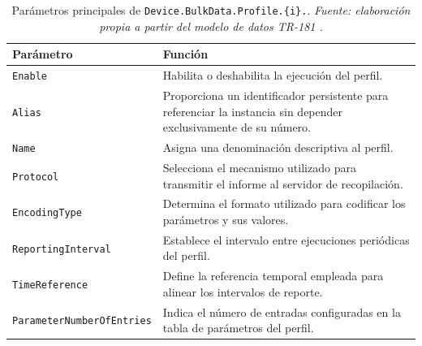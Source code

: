 \begin{table}[H]
    \centering
    \small
    \renewcommand{\arraystretch}{1.35}

    \caption[Parámetros principales de un perfil BulkData.]
    {Parámetros principales de
    \texttt{Device.BulkData.Profile.\{i\}.}.
    \textit{Fuente: elaboración propia a partir del modelo de datos
    TR-181 \cite{bbf_tr181}.}}

    \label{tab:parametros-perfil-bulkdata}

    \begin{tabular}{
        p{}
        p{}
    }
        \hline
        \textbf{Parámetro}
        &
        \textbf{Función}
        \\
        \hline

        \texttt{Enable}
        &
        Habilita o deshabilita la ejecución del perfil.
        \\

        \texttt{Alias}
        &
        Proporciona un identificador persistente para referenciar la
        instancia sin depender exclusivamente de su número.
        \\

        \texttt{Name}
        &
        Asigna una denominación descriptiva al perfil.
        \\

        \texttt{Protocol}
        &
        Selecciona el mecanismo utilizado para transmitir el informe al
        servidor de recopilación.
        \\

        \texttt{EncodingType}
        &
        Determina el formato utilizado para codificar los parámetros y
        sus valores.
        \\

        \texttt{ReportingInterval}
        &
        Establece el intervalo entre ejecuciones periódicas del perfil.
        \\

        \texttt{TimeReference}
        &
        Define la referencia temporal empleada para alinear los
        intervalos de reporte.
        \\

        \texttt{ParameterNumberOfEntries}
        &
        Indica el número de entradas configuradas en la tabla de
        parámetros del perfil.
        \\

        \hline
    \end{tabular}
\end{table}


